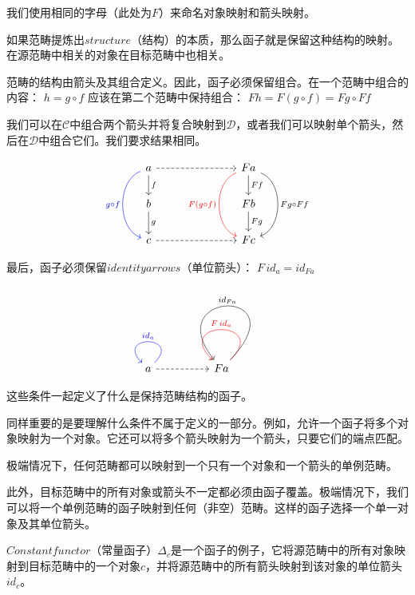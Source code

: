 \documentclass[DaoFP]{subfiles}
\begin{document}
    我们使用相同的字母（此处为$F$）来命名对象映射和箭头映射。

    如果范畴提炼出$structure$（结构）的本质，那么函子就是保留这种结构的映射。在源范畴中相关的对象在目标范畴中也相关。

    范畴的结构由箭头及其组合定义。因此，函子必须保留组合。在一个范畴中组合的内容：
    $h = g \circ f$
    应该在第二个范畴中保持组合：
    $F h = F (g \circ f) = F g \circ F f$

    我们可以在$\mathcal{C}$中组合两个箭头并将复合映射到$\mathcal{D}$，或者我们可以映射单个箭头，然后在$\mathcal{D}$中组合它们。我们要求结果相同。

    \[
        \begin{tikzcd}
            a
            \arrow[d, "f"]
            \arrow[rrr, dashed]
            \arrow[dd, bend right = 70, blue, "g \circ f"']
            &&& F a
            \arrow[d, "F f"]
            \arrow[dd, bend left = 70, "F g \circ F f"]
            \arrow[dd, bend right = 70, red, "F (g \circ f)"']
            \\
            b
            \arrow[d, "g"]
            &&& F b
            \arrow[d, "F g"]
            \\
            c
            \arrow[rrr, dashed]
            &&& F c
        \end{tikzcd}
    \]

    最后，函子必须保留$identity arrows$（单位箭头）：
    $F\, id_a = id_{F a}$

    \[
        \begin{tikzcd}
            a
            \arrow[loop, blue,  "id_a"']
            \arrow[rr, dashed]
            && F a
            \arrow[loop, red, "F \, id_{a}"']
            \arrow[loop, controls={+(2.5, 2.6) and +(-2, 2.5)}, "id_{F a}"']
        \end{tikzcd}
    \]

    这些条件一起定义了什么是保持范畴结构的函子。

    同样重要的是要理解什么条件不属于定义的一部分。例如，允许一个函子将多个对象映射为一个对象。它还可以将多个箭头映射为一个箭头，只要它们的端点匹配。

    极端情况下，任何范畴都可以映射到一个只有一个对象和一个箭头的单例范畴。

    此外，目标范畴中的所有对象或箭头不一定都必须由函子覆盖。极端情况下，我们可以将一个单例范畴的函子映射到任何（非空）范畴。这样的函子选择一个单一对象及其单位箭头。

    $Constant functor$（常量函子）$\Delta_c$是一个函子的例子，它将源范畴中的所有对象映射到目标范畴中的一个对象$c$，并将源范畴中的所有箭头映射到该对象的单位箭头$id_c$。
\end{document}
